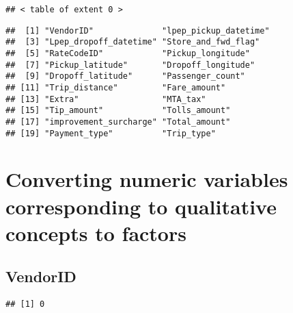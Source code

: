 \documentclass[]{article}
\newenvironment{Shaded}{\begin{snugshade}}{\end{snugshade}}
\newcommand{\KeywordTok}[1]{\textcolor[rgb]{0.13,0.29,0.53}{\textbf{{#1}}}}
\newcommand{\FloatTok}[1]{\textcolor[rgb]{0.00,0.00,0.81}{{#1}}}
\newcommand{\CommentTok}[1]{\textcolor[rgb]{0.56,0.35,0.01}{\textit{{#1}}}}
\newcommand{\OtherTok}[1]{\textcolor[rgb]{0.56,0.35,0.01}{{#1}}}
\newcommand{\NormalTok}[1]{{#1}}
\begin{document}
\begin{verbatim}
## < table of extent 0 >
\end{verbatim}

\begin{Shaded}
\end{Shaded}

\begin{verbatim}
##  [1] "VendorID"              "lpep_pickup_datetime" 
##  [3] "Lpep_dropoff_datetime" "Store_and_fwd_flag"   
##  [5] "RateCodeID"            "Pickup_longitude"     
##  [7] "Pickup_latitude"       "Dropoff_longitude"    
##  [9] "Dropoff_latitude"      "Passenger_count"      
## [11] "Trip_distance"         "Fare_amount"          
## [13] "Extra"                 "MTA_tax"              
## [15] "Tip_amount"            "Tolls_amount"         
## [17] "improvement_surcharge" "Total_amount"         
## [19] "Payment_type"          "Trip_type"
\end{verbatim}

\section{Converting numeric variables corresponding to qualitative
concepts to
factors}\label{converting-numeric-variables-corresponding-to-qualitative-concepts-to-factors}

\subsection{VendorID}\label{vendorid}

\begin{Shaded}
\end{Shaded}

\begin{verbatim}
## [1] 0
\end{verbatim}

\begin{Shaded}
\end{Shaded}
\end{document}
